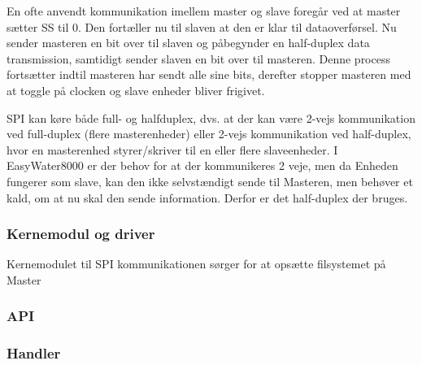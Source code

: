 En ofte anvendt kommunikation imellem master og slave foregår ved at master sætter SS til 0. Den fortæller nu til slaven at den er klar til 
dataoverførsel. Nu sender masteren en bit over til slaven og påbegynder en half-duplex data transmission, samtidigt sender slaven en bit over til masteren. Denne process fortsætter indtil masteren har sendt alle sine bits, derefter stopper masteren med at toggle på clocken og slave enheder bliver frigivet.

SPI kan køre både full- og halfduplex, dvs. at der kan være 2-vejs kommunikation ved full-duplex (flere masterenheder) eller 2-vejs kommunikation ved half-duplex, hvor en masterenhed styrer/skriver til en eller flere slaveenheder. I EasyWater8000 er der behov for at der kommunikeres 2 veje, men da Enheden fungerer som slave, kan den ikke selvstændigt sende til Masteren, men behøver et kald, om at nu skal den sende information. Derfor er det half-duplex der bruges.

\subsubsection*{Kernemodul og driver}

Kernemodulet til SPI kommunikationen sørger for at opsætte filsystemet på Master

\subsubsection*{API}

\subsubsection*{Handler}